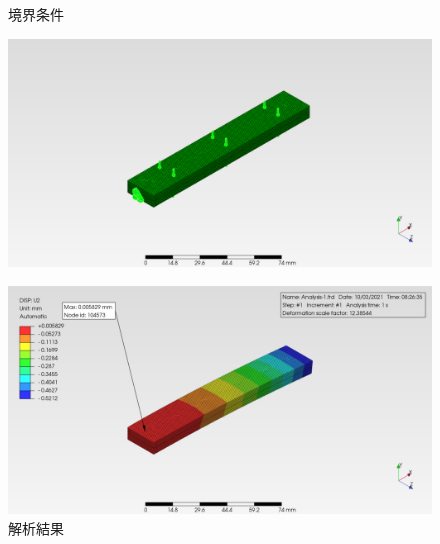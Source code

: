 \documentclass[a4j,20pt,slide]{ltjsarticle}
\begin{document}
\begin{figure}[H]
	\begin{minipage}{.49\hsize}
		\caption{境界条件}
		\label{12-01}
		\centering
		\includegraphics[width=.95\columnwidth]{fig/12-01.png}
	\end{minipage}
	\begin{minipage}{.49\hsize}
		\caption{解析結果}
		\label{12-02}
		\centering
		\includegraphics[width=.95\columnwidth]{fig/12-02.png}
	\end{minipage}
\end{figure}
\clearpage
%
\end{document}
